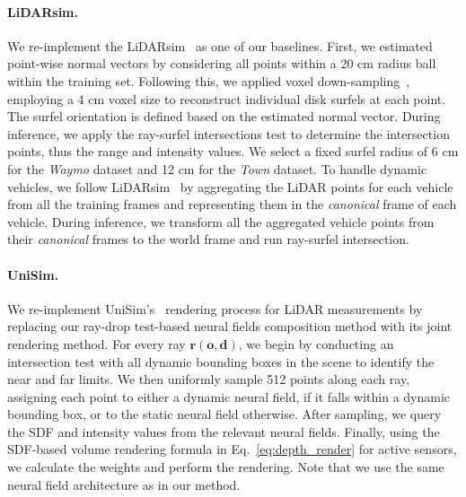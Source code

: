 \paragraph{LiDARsim.} We re-implement the LiDARsim~\cite{manivasagam2020lidarsim} as one of our baselines. 
First, we estimated point-wise normal vectors by considering all points within a 20 cm radius ball within the training set. Following this, we applied voxel down-sampling~\cite{tang2022torchsparse}, employing a 4 cm voxel size to reconstruct individual disk surfels at each point. The surfel orientation is defined based on the estimated normal vector. During inference, we apply the ray-surfel intersections test to determine the intersection points, thus the range and intensity values. We select a fixed surfel radius of 6 cm for the \textit{Waymo} dataset and 12 cm for the \textit{Town} dataset.
To handle dynamic vehicles, we follow LiDARsim~\cite{manivasagam2020lidarsim} by aggregating the LiDAR points for each vehicle from all the training frames and representing them in the \textit{canonical} frame of each vehicle. During inference, we transform all the aggregated vehicle points from their \textit{canonical} frames to the world frame and run ray-surfel intersection.

\paragraph{UniSim.} 
We re-implement UniSim's~\cite{yang2023unisim} rendering process for LiDAR measurements by replacing our ray-drop test-based neural fields composition method with its joint rendering method. For every ray $\mathbf{r} (\mathbf{o},\mathbf{d})$, we begin by conducting an intersection test with all dynamic bounding boxes in the scene to identify the near and far limits. We then uniformly sample 512 points along each ray, assigning each point to either a dynamic neural field, if it falls within a dynamic bounding box, or to the static neural field otherwise. After sampling, we query the SDF and intensity values from the relevant neural fields. Finally, using the SDF-based volume rendering formula in Eq.~\ref{eq:depth_render} for active sensors, we calculate the weights and perform the rendering. Note that we use the same neural field architecture as in our method.